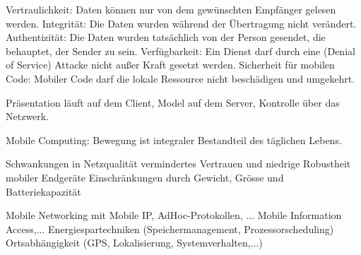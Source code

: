 \documentclass[ngerman,a4paper,12pt]{scrreprt}
\begin{document}
\ul
	\li Vertraulichkeit:
 \ra Daten können nur von dem
gewünschten Empfänger gelesen werden.
\li Integrität: \ra
Die Daten wurden während der
Übertragung nicht verändert.
\li Authentizität: \ra
Die Daten wurden tatsächlich
von der Person gesendet, die behauptet, der Sender zu sein.
\li Verfügbarkeit: \ra
Ein Dienst darf durch eine (Denial of Service) Attacke nicht außer Kraft
gesetzt werden.
\li Sicherheit für mobilen Code: \ra
Mobiler Code darf die lokale Ressource nicht beschädigen und
umgekehrt.

\ulE













Präsentation läuft auf dem Client, Model auf dem Server, Kontrolle über das Netzwerk.




Mobile Computing: Bewegung ist integraler Bestandteil des
täglichen Lebens. 

\ul
	\li Schwankungen in Netzqualität
	\li vermindertes Vertrauen und niedrige Robustheit mobiler Endgeräte
	\li Einschränkungen durch Gewicht, Grösse und Batteriekapazität
\ulE

\ul
	\li Mobile Networking mit Mobile IP, AdHoc-Protokollen, ...
	\li Mobile Information Access,...
	\li Energiespartechniken (Speichermanagement, Prozessorscheduling)
	\li Ortsabhängigkeit (GPS, Lokalisierung, Systemverhalten,...)
\ulE
\end{document}
